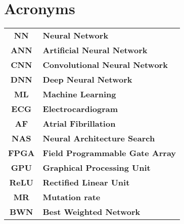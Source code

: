
\clearpage
{}
\section*{Acronyms}

\begingroup
\setlength{\tabcolsep}{12pt}
\renewcommand{\arraystretch}{1.5}
\begin{table}[ht]
\begin{tabular}{cl}
\textbf{NN}   & \textbf{Neural Network}                \\
\textbf{ANN}  & \textbf{Artificial Neural Network}     \\
\textbf{CNN}  & \textbf{Convolutional Neural Network}  \\
\textbf{DNN}  & \textbf{Deep Neural Network}           \\
\textbf{ML}   & \textbf{Machine Learning}              \\
\textbf{ECG}  & \textbf{Electrocardiogram}             \\
\textbf{AF}   & \textbf{Atrial Fibrillation}           \\
\textbf{NAS}  & \textbf{Neural Architecture Search}    \\
\textbf{FPGA} & \textbf{Field Programmable Gate Array} \\
\textbf{GPU}  & \textbf{Graphical Processing Unit}     \\
\textbf{ReLU} & \textbf{Rectified Linear Unit}         \\
\textbf{MR}   & \textbf{Mutation rate}                 \\
\textbf{BWN}   & \textbf{Best Weighted Network}                 \\
\end{tabular}
\end{table}
\endgroup

\vfill



\vfill

\thispagestyle{empty}